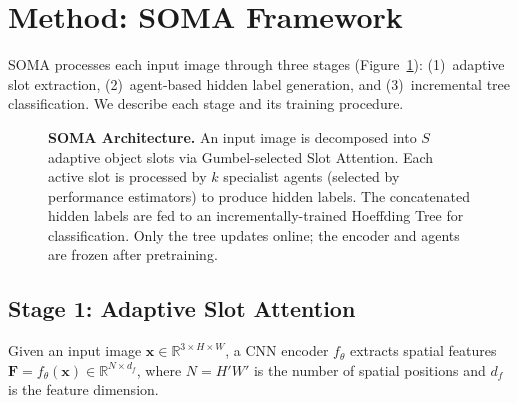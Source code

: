 \documentclass{article}
\newcommand{\R}{\mathbb{R}}
\begin{document}
\section{Method: SOMA Framework}
\label{sec:method}

SOMA processes each input image through three stages (Figure~\ref{fig:architecture}):
(1)~adaptive slot extraction,
(2)~agent-based hidden label generation, and
(3)~incremental tree classification.
We describe each stage and its training procedure.

\begin{figure}[t]
    \centering
    \caption{\textbf{SOMA Architecture.} An input image is decomposed into $S$ adaptive object slots via Gumbel-selected Slot Attention. Each active slot is processed by $k$ specialist agents (selected by performance estimators) to produce hidden labels. The concatenated hidden labels are fed to an incrementally-trained Hoeffding Tree for classification. Only the tree updates online; the encoder and agents are frozen after pretraining.}
    \label{fig:architecture}
\end{figure}

\subsection{Stage 1: Adaptive Slot Attention}
\label{sec:adaslot}

Given an input image $\mathbf{x} \in \R^{3 \times H \times W}$, a CNN encoder $f_\theta$ extracts spatial features $\mathbf{F} = f_\theta(\mathbf{x}) \in \R^{N \times d_f}$, where $N = H'W'$ is the number of spatial positions and $d_f$ is the feature dimension.
\end{document}

